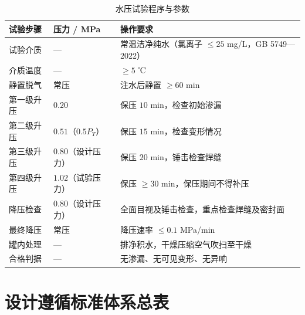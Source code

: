 \begin{table}[htbp]
  \centering
  \caption{水压试验程序与参数}
  \label{tab:cad-hydrotest-detail}
  \small\renewcommand{\arraystretch}{1.2}
  \setlength{\tabcolsep}{8pt}
  \begin{tabularx}{\textwidth}{@{}l l l @{}}
    \toprule
    \textbf{试验步骤} & \textbf{压力 / MPa} & \textbf{操作要求} \\
    \midrule
    试验介质                & —                     & 常温洁净纯水（氯离子 $\le 25$ mg/L，GB 5749—2022） \\
    介质温度                & —                     & $\ge 5$ ℃ \\
    静置脱气                & 常压                  & 注水后静置 $\ge 60$ min \\
    \midrule
    第一级升压              & $0.20$                & 保压 $10$ min，检查初始渗漏 \\
    第二级升压              & $0.51$（$0.5P_T$）   & 保压 $15$ min，检查变形情况 \\
    第三级升压              & $0.80$（设计压力）    & 保压 $20$ min，锤击检查焊缝 \\
    第四级升压              & $1.02$（试验压力）    & 保压 $\ge 30$ min，保压期间不得补压 \\
    \midrule
    降压检查                & $0.80$（设计压力）    & 全面目视及锤击检查，重点检查焊缝及密封面 \\
    最终降压                & 常压                  & 降压速率 $\le 0.1$ MPa/min \\
    罐内处理                & —                     & 排净积水，干燥压缩空气吹扫至干燥 \\
    \midrule
    合格判据                & —                     & 无渗漏、无可见变形、无异响 \\
    \bottomrule
  \end{tabularx}
\end{table}

\section{设计遵循标准体系总表}
\label{sec:cad-standards}

